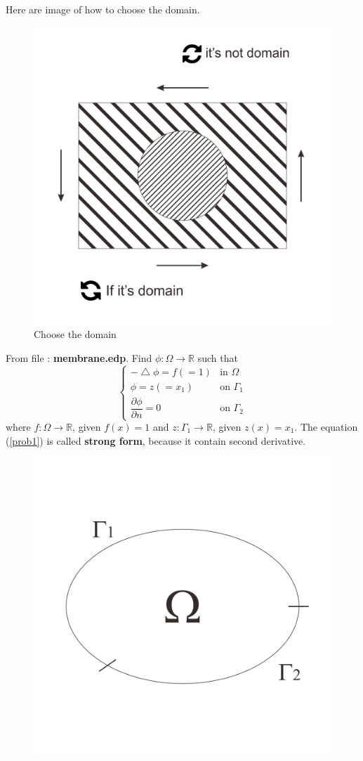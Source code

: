 \documentclass[a4paper,10pt]{article}
\begin{document}
\newpage
Here are image of how to choose the domain.
\begin{figure}[h!]
	\centering
	\includegraphics[width=0.5\linewidth]{picture/example2-2}
	\caption{Choose the domain}
	\label{fig:example2-2}
\end{figure}

From file : \textbf{membrane.edp}. Find $ \phi : \Omega \rightarrow \mathbb{R} $ such that
\begin{equation}\label{prob1}
\begin{cases}
-\bigtriangleup \phi = f (=1) & \text{in } \Omega \\
\phi = z (=x_{1}) & \text{on } \Gamma_{1} \\
\dfrac{\partial \phi}{\partial n} = 0 & \text{on } \Gamma_{2}
\end{cases}
\end{equation}
where $ f : \Omega \rightarrow \mathbb{R} $, given $ f(x)=1 $ and $ z : \Gamma_{1} \rightarrow \mathbb{R} $, given $ z(x)=x_{1} $. The equation (\ref{prob1}) is called \textbf{strong form}, because it contain second derivative.

\begin{figure}[h!]
	\centering
	\includegraphics[width=0.4\linewidth]{picture/strongformdomain}
	\caption{}
	\label{fig:strongformdomain}
\end{figure}
\end{document}
